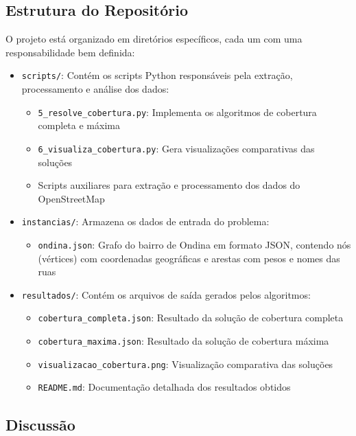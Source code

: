 \documentclass[12pt, a4paper]{report}
\begin{document}
\subsection{Estrutura do Repositório}
O projeto está organizado em diretórios específicos, cada um com uma responsabilidade bem definida:
\begin{itemize}
    \item \texttt{scripts/}: Contém os scripts Python responsáveis pela extração, processamento e análise dos dados:
    \begin{itemize}
        \item \texttt{5\_resolve\_cobertura.py}: Implementa os algoritmos de cobertura completa e máxima
        \item \texttt{6\_visualiza\_cobertura.py}: Gera visualizações comparativas das soluções
        \item Scripts auxiliares para extração e processamento dos dados do OpenStreetMap
    \end{itemize}
    
    \item \texttt{instancias/}: Armazena os dados de entrada do problema:
    \begin{itemize}
        \item \texttt{ondina.json}: Grafo do bairro de Ondina em formato JSON, contendo nós (vértices) com coordenadas geográficas e arestas com pesos e nomes das ruas
    \end{itemize}
    
    \item \texttt{resultados/}: Contém os arquivos de saída gerados pelos algoritmos:
    \begin{itemize}
        \item \texttt{cobertura\_completa.json}: Resultado da solução de cobertura completa
        \item \texttt{cobertura\_maxima.json}: Resultado da solução de cobertura máxima
        \item \texttt{visualizacao\_cobertura.png}: Visualização comparativa das soluções
        \item \texttt{README.md}: Documentação detalhada dos resultados obtidos
    \end{itemize}
\end{itemize}

\subsection{Discussão}
\end{document}
